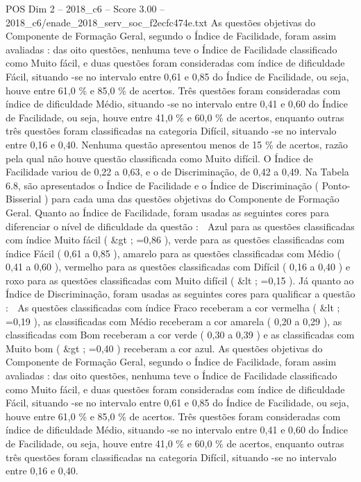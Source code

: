 \begin{textsample}{POS Dim 2 – 2018\_c6 – Score 3.00 – 2018\_c6/enade\_2018\_serv\_soc\_f2ecfc474e.txt}
As questões objetivas do Componente de Formação Geral, segundo o Índice de Facilidade, foram assim avaliadas : das oito questões, nenhuma teve o Índice de Facilidade classificado como Muito fácil, e duas questões foram consideradas com índice de dificuldade Fácil, situando -se no intervalo entre 0,61 e 0,85 do Índice de Facilidade, ou seja, houve entre 61,0 \% e 85,0 \% de acertos.
Três questões foram consideradas com índice de dificuldade Médio, situando -se no intervalo entre 0,41 e 0,60 do Índice de Facilidade, ou seja, houve entre 41,0 \% e 60,0 \% de acertos, enquanto outras três questões foram classificadas na categoria Difícil, situando -se no intervalo entre 0,16 e 0,40.
Nenhuma questão apresentou menos de 15 \% de acertos, razão pela qual não houve questão classificada como Muito difícil.
O Índice de Facilidade variou de 0,22 a 0,63, e o de Discriminação, de 0,42 a 0,49.
Na Tabela 6.8, são apresentados o Índice de Facilidade e o Índice de Discriminação ( Ponto-Bisserial ) para cada uma das questões objetivas do Componente de Formação Geral.
Quanto ao Índice de Facilidade, foram usadas as seguintes cores para diferenciar o nível de dificuldade da questão :  Azul para as questões classificadas com índice Muito fácil ( \&gt ; =0,86 ), verde para as questões classificadas com índice Fácil ( 0,61 a 0,85 ), amarelo para as questões classificadas com Médio ( 0,41 a 0,60 ), vermelho para as questões classificadas com Difícil ( 0,16 a 0,40 ) e roxo para as questões classificadas com Muito difícil ( \&lt ; =0,15 ).
Já quanto ao Índice de Discriminação, foram usadas as seguintes cores para qualificar a questão :  As questões classificadas com índice Fraco receberam a cor vermelha ( \&lt ; =0,19 ), as classificadas com Médio receberam a cor amarela ( 0,20 a 0,29 ), as classificadas com Bom receberam a cor verde ( 0,30 a 0,39 ) e as classificadas com Muito bom ( \&gt ; =0,40 ) receberam a cor azul.
As questões objetivas do Componente de Formação Geral, segundo o Índice de Facilidade, foram assim avaliadas : das oito questões, nenhuma teve o Índice de Facilidade classificado como Muito fácil, e duas questões foram consideradas com índice de dificuldade Fácil, situando -se no intervalo entre 0,61 e 0,85 do Índice de Facilidade, ou seja, houve entre 61,0 \% e 85,0 \% de acertos.
Três questões foram consideradas com índice de dificuldade Médio, situando -se no intervalo entre 0,41 e 0,60 do Índice de Facilidade, ou seja, houve entre 41,0 \% e 60,0 \% de acertos, enquanto outras três questões foram classificadas na categoria Difícil, situando -se no intervalo entre 0,16 e 0,40.

\end{textsample}
